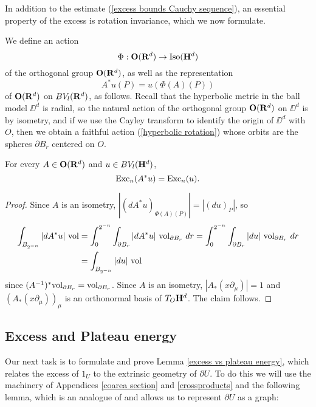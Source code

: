 In addition to the estimate (\ref{excess bounds Cauchy sequence}), an essential property of the excess is rotation invariance, which we now formulate.

\begin{notation}
We define an action
\begin{equation}\label{hyperbolic rotation}
    \Phi: \mathbf{O}(\mathbf{R}^d) \to \operatorname{Iso}(\mathbf H^d)
\end{equation}
of the orthogonal group $\mathbf{O}(\mathbf{R}^d)$, as well as the representation
$$A^* u(P) = u(\Phi(A)(P))$$
of $\mathbf{O}(\mathbf{R}^d)$ on $BV_l(\mathbf{R}^d)$, as follows.
Recall that the hyperbolic metric in the ball model $\DD^d$ is radial, so the natural action of the orthogonal group $\mathbf{O}(\mathbf{R}^d)$ on $\DD^d$ is by isometry, and if we use the Cayley transform to identify the origin of $\DD^d$ with $O$, then we obtain a faithful action (\ref{hyperbolic rotation}) whose orbits are the spheres $\partial B_r$ centered on $O$.
\end{notation}

\begin{lemma}\label{excess rotation invariant}
For every $A \in \mathbf{O}(\mathbf{R}^d)$ and $u \in BV_l(\mathbf H^d)$,
$$\operatorname{Exc}_n(A^* u) = \operatorname{Exc}_n(u).$$
\end{lemma}
\begin{proof}
Since $A$ is an isometry, $|(d A^* u)_{\Phi(A)(P)}| = |(du)_P|$, so
\begin{align*}
\int_{B_{2^{-n}}} |dA^*u| ~\mathrm{vol} &= \int_0^{2^{-n}} \int_{\partial B_r} |dA^* u| ~\mathrm{vol}_{\partial B_r} ~dr = \int_0^{2^{-n}} \int_{\partial B_r} |du| ~\mathrm{vol}_{\partial B_r} ~dr\\
&= \int_{B_{2^{-n}}} |du| ~\mathrm{vol}
\end{align*}
since $(A^{-1})^* \mathrm{vol}_{\partial B_r} = \mathrm{vol}_{\partial B_r}$.
Since $A$ is an isometry, $|A_* (x \partial_\mu)| = 1$ and $(A_*(x \partial_\mu))_\mu$ is an orthonormal basis of $T_O \mathbf H^d$.
The claim follows.
\end{proof}

\subsection{Excess and Plateau energy}
Our next task is to formulate and prove Lemma \ref{excess vs plateau energy}, which relates the excess of $1_U$ to the extrinsic geometry of $\partial U$.
To do this we will use the machinery of Appendices \ref{coarea section} and \ref{crossproducts} and the following lemma, which is an analogue of \cite[Theorem 4.8]{Giusti77} and allows us to represent $\partial U$ as a graph:

